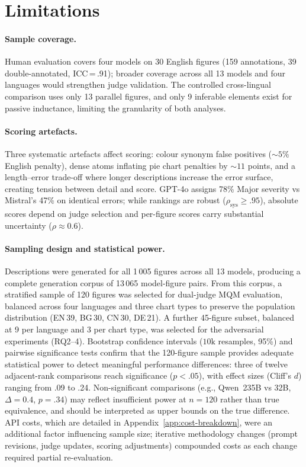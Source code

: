 \section{Limitations}\label{sec:limitations}

\paragraph{Sample coverage.}
Human evaluation covers four models on 30 English figures (159 annotations, 39 double-annotated, ICC\,=\,.91); broader coverage across all 13 models and four languages would strengthen judge validation.
The controlled cross-lingual comparison uses only 13 parallel figures, and only 9 inferable elements exist for passive inductance, limiting the granularity of both analyses.

\paragraph{Scoring artefacts.}
Three systematic artefacts affect scoring: colour synonym false positives (${\sim}5\%$ English penalty), dense atoms inflating pie chart penalties by ${\sim}11$ points, and a length--error trade-off where longer descriptions increase the error surface, creating tension between detail and score.
GPT-4o assigns 78\% Major severity vs Mistral's 47\% on identical errors; while rankings are robust ($\rho_{\text{sys}}\geq.95$), absolute scores depend on judge selection and per-figure scores carry substantial uncertainty ($\rho{\approx}0.6$).

\paragraph{Sampling design and statistical power.}
Descriptions were generated for all 1\,005 figures across all 13 models, producing a complete generation corpus of 13\,065 model-figure pairs.
From this corpus, a stratified sample of 120 figures was selected for dual-judge MQM evaluation, balanced across four languages and three chart types to preserve the population distribution (EN\,39, BG\,30, CN\,30, DE\,21).
A further 45-figure subset, balanced at 9 per language and 3 per chart type, was selected for the adversarial experiments (RQ2--4).
Bootstrap confidence intervals ($10\text{k}$ resamples, 95\%) and pairwise significance tests confirm that the 120-figure sample provides adequate statistical power to detect meaningful performance differences: three of twelve adjacent-rank comparisons reach significance ($p{<}.05$), with effect sizes (Cliff's $d$) ranging from .09 to .24.
Non-significant comparisons (e.g., Qwen~235B vs 32B, $\Delta{=}0.4$, $p{=}.34$) may reflect insufficient power at $n{=}120$ rather than true equivalence, and should be interpreted as upper bounds on the true difference.
API costs, which are detailed in Appendix~\ref{app:cost-breakdown}, were an additional factor influencing sample size; iterative methodology changes (prompt revisions, judge updates, scoring adjustments) compounded costs as each change required partial re-evaluation.

